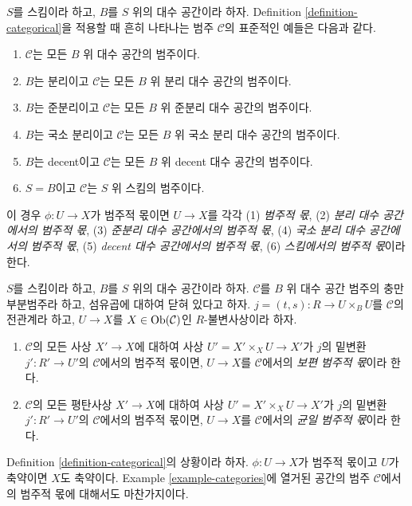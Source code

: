 \begin{example}
\label{example-categories}
$S$를 스킴이라 하고, $B$를 $S$ 위의 대수 공간이라 하자.
Definition \ref{definition-categorical}을 적용할 때 흔히 나타나는 범주
$\mathcal{C}$의 표준적인 예들은 다음과 같다.
\begin{enumerate}
\item $\mathcal{C}$는 모든 $B$ 위 대수 공간의 범주이다.
\item $B$는 분리이고 $\mathcal{C}$는 모든 $B$ 위 분리 대수 공간의 범주이다.
\item $B$는 준분리이고 $\mathcal{C}$는 모든 $B$ 위 준분리 대수 공간의 범주이다.
\item $B$는 국소 분리이고 $\mathcal{C}$는 모든 $B$ 위 국소 분리 대수 공간의 범주이다.
\item $B$는 decent이고 $\mathcal{C}$는 모든 $B$ 위 decent 대수 공간의 범주이다.
\item $S = B$이고 $\mathcal{C}$는 $S$ 위 스킴의 범주이다.
\end{enumerate}
이 경우 $\phi : U \to X$가 범주적 몫이면 $U \to X$를 각각
(1) {\it 범주적 몫},
(2) {\it 분리 대수 공간에서의 범주적 몫},
(3) {\it 준분리 대수 공간에서의 범주적 몫},
(4) {\it 국소 분리 대수 공간에서의 범주적 몫},
(5) {\it decent 대수 공간에서의 범주적 몫},
(6) {\it 스킴에서의 범주적 몫}이라 한다.
\end{example}

\begin{definition}
\label{definition-universal-categorical}
$S$를 스킴이라 하고, $B$를 $S$ 위의 대수 공간이라 하자.
$\mathcal{C}$를 $B$ 위 대수 공간 범주의 충만 부분범주라 하고,
섬유곱에 대하여 닫혀 있다고 하자.
$j = (t, s) : R \to U \times_B U$를 $\mathcal{C}$의 전관계라 하고,
$U \to X$를 $X \in \mathop{\mathrm{Ob}}\nolimits(\mathcal{C})$인 $R$-불변사상이라 하자.
\begin{enumerate}
\item $\mathcal{C}$의 모든 사상 $X' \to X$에 대하여 사상
$U' = X' \times_X U \to X'$가 $j$의 밑변환
$j' : R' \to U'$의 $\mathcal{C}$에서의 범주적 몫이면,
$U \to X$를 $\mathcal{C}$에서의 {\it 보편 범주적 몫}이라 한다.
\item $\mathcal{C}$의 모든 평탄사상 $X' \to X$에 대하여 사상
$U' = X' \times_X U \to X'$가 $j$의 밑변환
$j' : R' \to U'$의 $\mathcal{C}$에서의 범주적 몫이면,
$U \to X$를 $\mathcal{C}$에서의 {\it 균일 범주적 몫}이라 한다.
\end{enumerate}
\end{definition}

\begin{lemma}
\label{lemma-categorical-reduced}
Definition \ref{definition-categorical}의 상황이라 하자.
$\phi : U \to X$가 범주적 몫이고 $U$가 축약이면 $X$도 축약이다.
Example \ref{example-categories}에 열거된 공간의 범주 $\mathcal{C}$에서의
범주적 몫에 대해서도 마찬가지이다.
\end{lemma}

